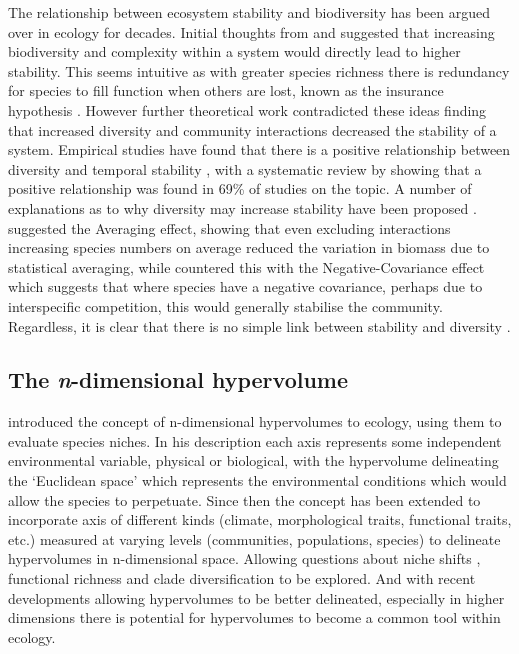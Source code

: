 The relationship between ecosystem stability and biodiversity has been argued over in ecology for decades. Initial thoughts from \cite{Elton1958} and \cite{MacArthur1955} suggested that increasing biodiversity and complexity within a system would directly lead to higher stability. This seems intuitive as with greater species richness there is redundancy for species to fill function when others are lost, known as the insurance hypothesis \citep{Yachi1999}. However further theoretical work contradicted these ideas \citep{May1973} finding that increased diversity and community interactions decreased the stability of a system. Empirical studies have found that there is a positive relationship between diversity and temporal stability \citep{Tilman1994, Tilman2006}, with a systematic review by \cite{Ives2007} showing that a positive relationship was found in 69\% of studies on the topic. A number of explanations as to why diversity may increase stability have been proposed \citep{McCann2000}. \cite{Doak1998} suggested the Averaging effect, showing that even excluding interactions increasing species numbers on average reduced the variation in biomass due to statistical averaging, while \cite{Tilman1998} countered this with the Negative-Covariance effect which suggests that where species have a negative covariance, perhaps due to interspecific competition, this would generally stabilise the community. Regardless, it is clear that there is no simple link between stability and diversity \citep{Goodman1975}.


\subsection{The \emph{n}-dimensional hypervolume}

\cite{Hutchinson1957} introduced the concept of n-dimensional hypervolumes to ecology, using them to evaluate species niches. In his description each axis represents some independent environmental variable, physical or biological, with the hypervolume delineating the ‘Euclidean space’ which represents the environmental conditions which would allow the species to perpetuate. Since then the concept has been extended to incorporate axis of different kinds (climate, morphological traits, functional traits, etc.) measured at varying levels (communities, populations, species) to delineate hypervolumes in n-dimensional space. Allowing questions about niche shifts \citep{Tingley2014, Blonder2015, Jackson2000, Evans2009}, functional richness \citep{Lamanna2014} and clade diversification \citep{Sidlauskas2008} to be explored. And with recent developments allowing hypervolumes to be better delineated, especially in higher dimensions \citep{Blonder2014, Blonder2017b, Junker2016} there is potential for hypervolumes to become a common tool within ecology.

